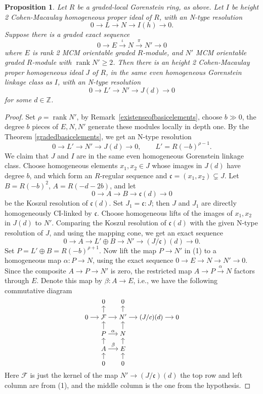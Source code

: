\documentclass[11pt,letterpaper]{amsart}
\newcommand{\x}{\xrightarrow{}}
\DeclareMathOperator{\rank}{rank}
\theoremstyle{plain}
\newtheorem{prop}[thm]{Proposition}
\theoremstyle{definition}
\theoremstyle{remark}
\begin{document}
\begin{prop}\cite[Proposition~3.4]{CasanellasDrozdHartshorne+2005+149+171}\label{lemma3.4CDH} Let $R$ be a graded-local Gorenstein ring, as above. Let $I$ be height 2 Cohen-Macaulay homogeneous proper ideal of $R$, with an N-type resolution $$ 0\x L\x N\x I(h)\x 0.$$ Suppose there is a graded exact sequence $$0\x E\xrightarrow{\iota} N\xrightarrow{\pi} N'\x0$$ where $E$ is rank 2 MCM orientable graded $R$-module, and $N'$ MCM orientable graded $R$-module with $\rank N'\ge 2$. Then there is an height 2 Cohen-Macaulay proper homogeneous ideal $J$ of $R$, in the same even homogeneous Gorenstein linkage class as $I$, with an N-type resolution $$0\x L'\x N'\x J(d)\x 0$$ for some $d\in\mathbb{Z}$.    
\end{prop} 

\begin{proof}
Set \(\rho=\rank N'\), by Remark~\ref{existenseofbasicelements}, choose \(b\gg0\), the degree \(b\) pieces of \(E,N,N'\) generate these modules locally in depth one.
By the Theorem \ref{gradedbasicelements}, we get an N-type resolution 
\[
0\longrightarrow L'\longrightarrow N'\longrightarrow J(d)\longrightarrow0,
\qquad L'=R(-b)^{\rho-1}.
\]
We claim that \(J\) and \(I\) are in the same even homogeneous Gorenstein linkage class. Choose homogeneous elements \(x_1,x_2\in J\) whose images in \(J(d)\) have degree \(b\), and which form an \(R\)-regular sequence and \(\mathfrak c=(x_1,x_2)\subsetneq J\). Let \(B=R(-b)^2\), 
\(A=R(-d-2b)\), and let
\[
0\longrightarrow A\longrightarrow B\longrightarrow \mathfrak c(d)\longrightarrow0
\]
be the Koszul resolution of \(\mathfrak c(d)\). Set \(J_1=\mathfrak c:J\); then \(J\) and \(J_1\) are directly homogeneously CI-linked by \(\mathfrak c\). Choose homogeneous lifts of the images of \(x_1,x_2\) in \(J(d)\) to \(N'\). Comparing the Koszul resolution of \(\mathfrak c(d)\) with the given N-type resolution of \(J\), and using the mapping cone, we get an exact sequence
\[
0\longrightarrow A\longrightarrow L'\oplus B\longrightarrow N'\longrightarrow (J/\mathfrak c)(d)\longrightarrow0.\tag{1}
\]
Set \(P=L'\oplus B=R(-b)^{\rho+1}\). Now lift the map \(P\to N'\) in (1) to a homogeneous map \(\alpha:P\to N\), using the exact sequence \(0\to E\to N\to N'\to0\). Since the composite \(A\to P\to N'\) is zero, the restricted map \(A\to P\xrightarrow{\alpha}N\) factors through \(E\). Denote this map by \(\beta:A\to E\), i.e., we have the following commutative diagram
\[
\begin{tikzcd}[row sep=small, column sep=small,
              font=\small, cramped]
  & 0 & 0 \\
0 \arrow[r]
  & \mathcal F \arrow[u] \arrow[r]
  & N' \arrow[u] \arrow[r]
  & (J/c)(d) \arrow[r] & 0 \\
  & P \arrow[u] \arrow[r,"\alpha"]
  & N \arrow[u] \\
  & A \arrow[u] \arrow[r,"\beta"]
  & E \arrow[u] \\
  & 0 \arrow[u]
  & 0 \arrow[u]
\end{tikzcd}
\]
Here \(\mathcal F\) is just the kernel of the map \(N'\to (J/\mathfrak c)(d)\) the top row and left column are from (1), and the middle column is the one from the hypothesis.


\end{proof}
\end{document}

